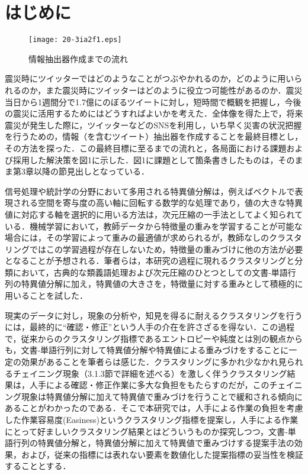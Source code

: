 \documentclass[japanese]{jnlp_1.4}
\begin{document}
\maketitle


\section{はじめに}

\begin{figure}[b]
\begin{center}
\texttt{[image: 20-3ia2f1.eps]}
\end{center}
\caption{情報抽出器作成までの流れ}
\end{figure}

震災時にツイッターではどのようなことがつぶやかれるのか，どのように用いられるのか，また震災時にツイッターはどのように役立つ可能性があるのか．震災当日から1週間分で1.7億にのぼるツイートに対し，短時間で概観を把握し，今後の震災に活用するためにはどうすればよいかを考えた．全体像を得た上で，将来震災が発生した際に，ツイッターなどのSNSを利用し，いち早く災害の状況把握を行うための，情報（を含むツイート）抽出器を作成することを最終目標とし，その方法を探った．この最終目標に至るまでの流れと，各局面における課題および採用した解決策を図1に示した．図1に課題として箇条書きしたものは，そのまま第3章以降の節見出しとなっている．

信号処理や統計学の分野において多用される特異値分解は，例えばベクトルで表現される空間を寄与度の高い軸に回転する数学的な処理であり，値の大きな特異値に対応する軸を選択的に用いる方法は，次元圧縮の一手法としてよく知られている．機械学習において，教師データから特徴量の重みを学習することが可能な場合には，その学習によって重みの最適値が求められるが，教師なしのクラスタリングではこの学習過程が存在しないため，特徴量の重みづけに他の方法が必要となることが予想される．筆者らは，本研究の過程に現れるクラスタリングと分類において，古典的な類義語処理および次元圧縮のひとつとしての文書‐単語行列の特異値分解に加え，特異値の大きさを，特徴量に対する重みとして積極的に用いることを試した．

現実のデータに対し，現象の分析や，知見を得るに耐えるクラスタリングを行うには，最終的に``確認・修正''という人手の介在を許さざるを得ない．この過程で，従来からのクラスタリング指標であるエントロピーや純度とは別の観点からも，文書‐単語行列に対して特異値分解や特異値による重みづけをすることに一定の効果があることを筆者らは感じた．クラスタリングに多かれ少なかれ見られるチェイニング現象（3.1.3節で詳細を述べる）を激しく伴うクラスタリング結果は，人手による確認・修正作業に多大な負担をもたらすのだが，このチェイニング現象は特異値分解に加えて特異値で重みづけを行うことで緩和される傾向にあることがわかったのである．そこで本研究では，人手による作業の負担を考慮した作業容易度(Easiness)というクラスタリング指標を提案し，人手による作業にとって好ましいクラスタリング結果とはどういうものか探究しつつ，文書‐単語行列の特異値分解と，特異値分解に加えて特異値で重みづけする提案手法の効果，および，従来の指標には表れない要素を数値化した提案指標の妥当性を検証することとする．
\end{document}
